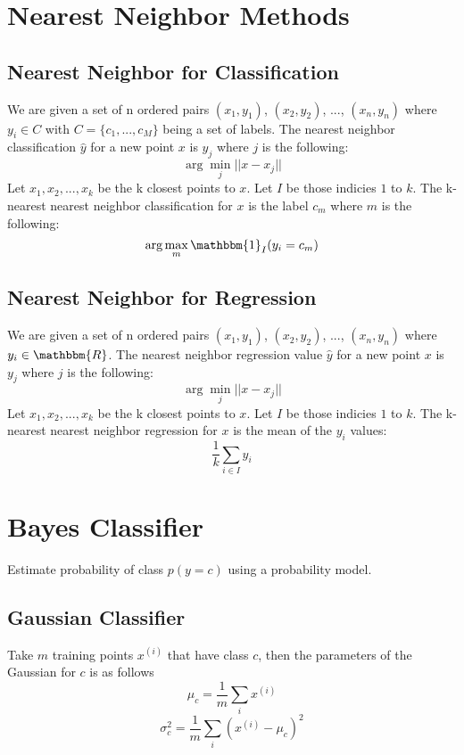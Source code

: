 \documentclass[twoside,11pt]{article}
\theoremstyle{definition}
\begin{document}
\section{Nearest Neighbor Methods}

\subsection{Nearest Neighbor for Classification}

We are given a set of n ordered pairs $(x_1,y_1)$, $(x_2,y_2)$, ..., $(x_n,y_n)$ where $y_i \in C$ with $C=\{ c_1, ..., c_M \}$ being a set of labels. The nearest neighbor classification $\hat{y}$ for a new point $x$ is $y_j$ where $j$ is the following:
\[
\arg \min_j||x-x_j||
\]
Let $x_1,x_2,...,x_k$ be the k closest points to $x$. Let $I$ be those indicies $1$ to $k$. The k-nearest nearest neighbor classification for $x$ is the label $c_m$ where $m$ is the following:
\[
\arg \max_m \mathbbm{1}_{I}{(y_i=c_m)}
\]

\subsection{Nearest Neighbor for Regression}

We are given a set of n ordered pairs $(x_1,y_1)$, $(x_2,y_2)$, ..., $(x_n,y_n)$ where $y_i \in \mathbbm{R}$. The nearest neighbor regression value $\hat{y}$ for a new point $x$ is $y_j$ where $j$ is the following:
\[
\arg \min_j||x-x_j||
\]
Let $x_1,x_2,...,x_k$ be the k closest points to $x$. Let $I$ be those indicies $1$ to $k$. The k-nearest nearest neighbor regression for $x$ is the mean of the $y_i$ values:
\[
\frac{1}{k} \sum_{i \in I} y_i
\]

\newpage

\section{Bayes Classifier}

Estimate probability of class $p(y=c)$ using a probability model. 

\subsection{Gaussian Classifier}

Take $m$ training points $x^{(i)}$ that have class $c$, then the parameters of the Gaussian for $c$ is as follows
\[
\mu_c = \frac{1}{m} \sum_{i} x^{(i)}
\]
\[
\sigma_c^2 = \frac{1}{m} \sum_{i} (x^{(i)} - \mu_c)^2
\]
\end{document}
